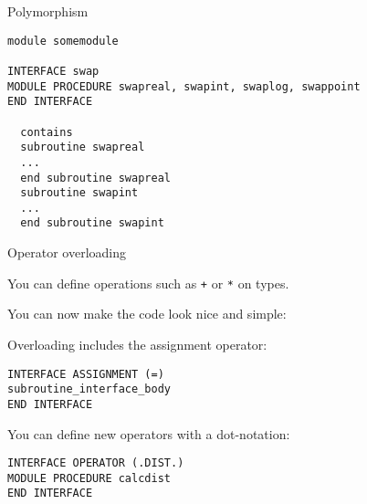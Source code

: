  {Polymorphism}
\label{sec:f-polyfunction}

\begin{lstlisting}
module somemodule

INTERFACE swap
MODULE PROCEDURE swapreal, swapint, swaplog, swappoint
END INTERFACE

  contains
  subroutine swapreal
  ...
  end subroutine swapreal
  subroutine swapint
  ...
  end subroutine swapint
\end{lstlisting}

 {Operator overloading}

You can define operations such as \lstinline{+} or \lstinline{*} on types.

\begin{multicols}{2}
\end{multicols}

You can now make the code look nice and simple:

Overloading includes the assignment operator:

\begin{lstlisting}
INTERFACE ASSIGNMENT (=) 
subroutine_interface_body
END INTERFACE
\end{lstlisting}

You can define new operators with a dot-notation:

\begin{lstlisting}
INTERFACE OPERATOR (.DIST.)
MODULE PROCEDURE calcdist
END INTERFACE
\end{lstlisting}

